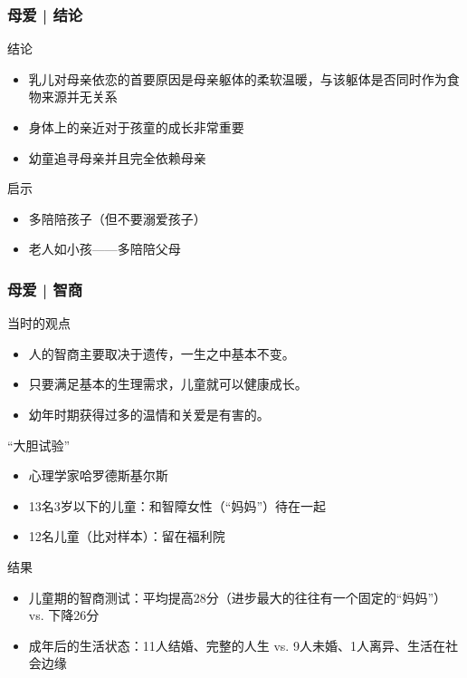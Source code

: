 \begin{frame}
  \frametitle{母爱 | 结论}
  \begin{block}{结论}
    \begin{itemize}
      \item 乳儿对母亲依恋的首要原因是母亲躯体的柔软温暖，与该躯体是否同时作为食物来源并无关系
      \item 身体上的亲近对于孩童的成长非常重要
      \item 幼童追寻母亲并且完全依赖母亲
    \end{itemize}
  \end{block}
  \pause
  \begin{block}{启示}
    \begin{itemize}
      \item 多陪陪孩子（但不要溺爱孩子）
      \item 老人如小孩——多陪陪父母
    \end{itemize}
  \end{block}
\end{frame}

\begin{frame}
  \frametitle{母爱 | 智商}
  \begin{block}{当时的观点}
    \begin{itemize}
      \item 人的智商主要取决于遗传，一生之中基本不变。
      \item 只要满足基本的生理需求，儿童就可以健康成长。
      \item 幼年时期获得过多的温情和关爱是有害的。
    \end{itemize}
  \end{block}
  \vspace{-0.6em}
  \pause
  \begin{block}{“大胆试验”}
    \begin{itemize}
      \item 心理学家哈罗德\textbullet 斯基尔斯
      \item 13名3岁以下的儿童：和智障女性（“妈妈”）待在一起
      \item 12名儿童（比对样本）：留在福利院
    \end{itemize}
  \end{block}
  \vspace{-0.6em}
  \pause
  \begin{block}{结果}
    \begin{itemize}
      \item 儿童期的智商测试：平均提高28分（进步最大的往往有一个固定的“妈妈”） vs. 下降26分
      \item 成年后的生活状态：11人结婚、完整的人生 vs. 9人未婚、1人离异、生活在社会边缘
    \end{itemize}
  \end{block}
\end{frame}

